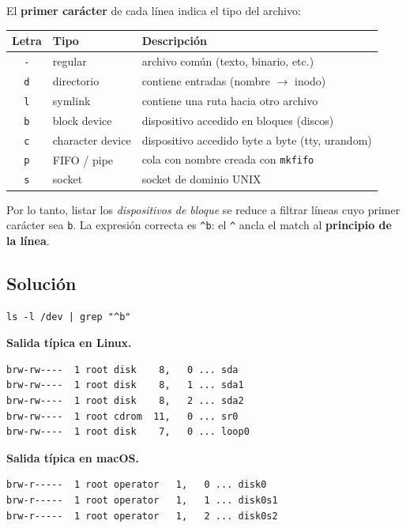 \documentclass[11pt,a4paper]{article}
\begin{document}
El \textbf{primer carácter} de cada línea indica el tipo del archivo:

\begin{center}
\small
\begin{tabular}{@{}clp{8.5cm}@{}}
\toprule
Letra & Tipo & Descripción \\
\midrule
\texttt{-} & regular         & archivo común (texto, binario, etc.) \\
\texttt{d} & directorio       & contiene entradas (nombre $\to$ inodo) \\
\texttt{l} & symlink          & contiene una ruta hacia otro archivo \\
\texttt{b} & block device     & dispositivo accedido en bloques (discos) \\
\texttt{c} & character device & dispositivo accedido byte a byte (tty, urandom) \\
\texttt{p} & FIFO / pipe      & cola con nombre creada con \texttt{mkfifo} \\
\texttt{s} & socket           & socket de dominio UNIX \\
\bottomrule
\end{tabular}
\end{center}

Por lo tanto, listar los \emph{dispositivos de bloque} se reduce a
filtrar líneas cuyo primer carácter sea \texttt{b}. La expresión
correcta es \verb|^b|: el \verb|^| ancla el match al \textbf{principio
de la línea}.

\subsection*{Solución}

\begin{lstlisting}[style=shellstyle]
ls -l /dev | grep "^b"
\end{lstlisting}

\textbf{Salida típica en Linux.}

\begin{lstlisting}[style=textstyle]
brw-rw----  1 root disk    8,   0 ... sda
brw-rw----  1 root disk    8,   1 ... sda1
brw-rw----  1 root disk    8,   2 ... sda2
brw-rw----  1 root cdrom  11,   0 ... sr0
brw-rw----  1 root disk    7,   0 ... loop0
\end{lstlisting}

\textbf{Salida típica en macOS.}

\begin{lstlisting}[style=textstyle]
brw-r-----  1 root operator   1,   0 ... disk0
brw-r-----  1 root operator   1,   1 ... disk0s1
brw-r-----  1 root operator   1,   2 ... disk0s2
\end{lstlisting}
\end{document}
